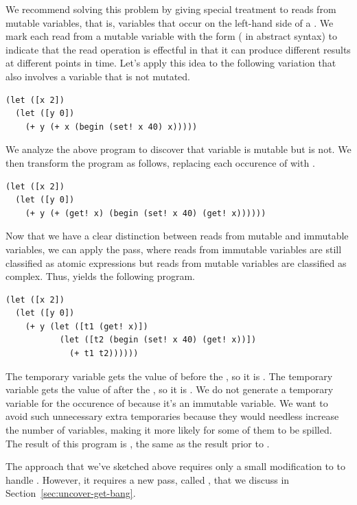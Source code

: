 \documentclass[7x10,nocrop]{TimesAPriori_MIT}%
\begin{document}
{We recommend solving this problem by giving special treatment to reads
from mutable variables, that is, variables that occur on the left-hand
side of a . We mark each read from a mutable variable with
the form  ( in abstract syntax) to indicate
that the read operation is effectful in that it can produce different
results at different points in time. Let's apply this idea to the
following variation that also involves a variable that is not mutated.
\begin{lstlisting}
(let ([x 2])
  (let ([y 0])
    (+ y (+ x (begin (set! x 40) x)))))
\end{lstlisting}
We analyze the above program to discover that variable  is
mutable but  is not. We then transform the program as follows,
replacing each occurence of  with .
\begin{lstlisting}
(let ([x 2])
  (let ([y 0])
    (+ y (+ (get! x) (begin (set! x 40) (get! x))))))
\end{lstlisting}
Now that we have a clear distinction between reads from mutable and
immutable variables, we can apply the 
pass, where reads from immutable variables are still classified as
atomic expressions but reads from mutable variables are classified as
complex.  Thus,  yields the following
program.
\begin{lstlisting}
(let ([x 2])
  (let ([y 0])
    (+ y (let ([t1 (get! x)])
           (let ([t2 (begin (set! x 40) (get! x))])
             (+ t1 t2))))))
\end{lstlisting}
The temporary variable  gets the value of  before the
, so it is .  The temporary variable  gets
the value of  after the , so it is .  We
do not generate a temporary variable for the occurence of 
because it's an immutable variable. We want to avoid such unnecessary
extra temporaries because they would needless increase the number of
variables, making it more likely for some of them to be spilled.  The
result of this program is , the same as the result prior to
.

The approach that we've sketched above requires only a small
modification to  to handle
. However, it requires a new pass, called
, that we discuss in
Section~\ref{sec:uncover-get-bang}.

}
\end{document}
